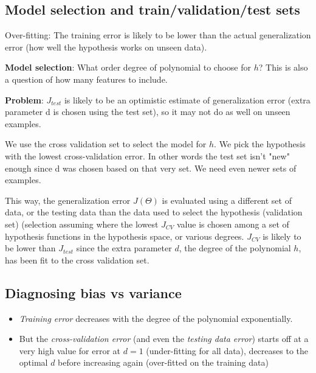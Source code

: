 \documentclass{article}
\begin{document}
\subsection{Model selection and train/validation/test sets}

Over-fitting: The training error is likely to be lower than the actual generalization error (how well the hypothesis works on unseen data).




\textbf{Model selection}: What order degree of polynomial to choose for $h$? This is also a question of how many features to include.

\begin{myboxr}

\textbf{Problem}: $J_{test}$ is likely to be an optimistic estimate of generalization error (extra parameter d is chosen using the test set), so it may not do as well on unseen examples.

\end{myboxr}

We use the cross validation set to select the model for $h$.
We pick the hypothesis with the lowest cross-validation error.
In other words the test set isn't "new" enough since d was chosen based on that very set. We need even newer sets of examples.


This way, the generalization error $J(\Theta)$ is evaluated using a different set of data, or the testing data than the data used to select the hypothesis (validation set) (selection assuming where the lowest $J_{CV}$ value is chosen among a set of hypothesis functions in the hypothesis space, or various degrees. $J_{CV}$ is likely to be lower than $J_{test}$ since the extra parameter $d$, the degree of the polynomial $h$, has been fit to the cross validation set.


\subsection{Diagnosing bias vs variance}


\begin{itemize}
  \item \textit{Training error }decreases with the degree of the polynomial exponentially.
  \item But the \textit{cross-validation error} (and even the \textit{testing data error}) starts off at a very high value for error at $d = 1$ (under-fitting for all data), decreases to the optimal $d$ before increasing again (over-fitted on the training data)
\end{itemize}
\end{document}
